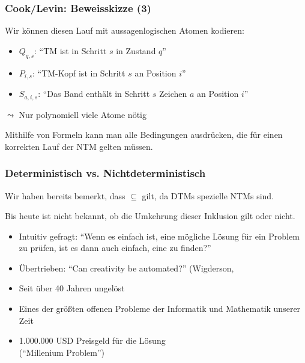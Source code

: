 \documentclass[onlymath]{beamer}
\begin{document}
\begin{frame}\frametitle{Cook/Levin: Beweisskizze (3)}

Wir können diesen Lauf mit aussagenlogischen Atomen kodieren:
\begin{itemize}
\item $Q_{q,s}$: "`TM ist in Schritt $s$ in Zustand $q$"'
% 
\item $P_{i,s}$: "`TM-Kopf ist in Schritt $s$ an Position $i$"'
\item $S_{a,i,s}$: "`Das Band enthält in Schritt $s$ Zeichen $a$ an Position $i$"'
\end{itemize}
$\leadsto$ Nur polynomiell viele Atome nötig
\bigskip

Mithilfe von Formeln kann man alle Bedingungen ausdrücken, die für einen korrekten Lauf der NTM gelten müssen.

\medskip



\end{frame}

\begin{frame}\frametitle{Deterministisch vs. Nichtdeterministisch}

	Wir haben bereits bemerkt, dass  ${}\subseteq{}$  gilt, da DTMs spezielle NTMs sind.
	\medskip

  \alert{Bis heute ist nicht bekannt, ob die Umkehrung dieser Inklusion gilt oder nicht.}
  \begin{itemize}
  \item Intuitiv gefragt: "`Wenn es einfach ist, eine mögliche Lösung für ein Problem zu prüfen, ist es dann auch einfach, eine zu finden?"'
  \item Übertrieben: "`Can creativity be automated?"' (Wigderson, 
  \item Seit über 40 Jahren ungelöst
  \item Eines der größten offenen Probleme der Informatik und Mathematik unserer Zeit
  \item 1.000.000 USD Preisgeld für die Lösung\\("`Millenium Problem"')
  \end{itemize}
   
\end{frame}
\end{document}
